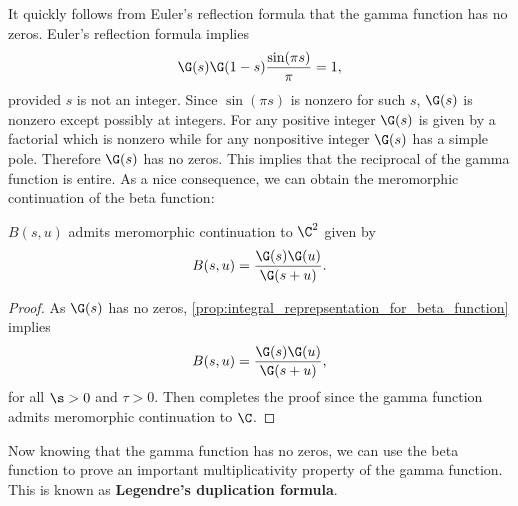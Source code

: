 \documentclass[12pt]{article}
\begin{document}
      It quickly follows from Euler's reflection formula that the gamma function has no zeros. Euler's reflection formula implies
      \[
        \G(s)\G(1-s)\frac{\sin(\pi s)}{\pi} = 1,
      \]
      provided \(s\) is not an integer. Since \(\sin(\pi s)\) is nonzero for such \(s\), \(\G(s)\) is nonzero except possibly at integers. For any positive integer \(\G(s)\) is given by a factorial which is nonzero while for any nonpositive integer \(\G(s)\) has a simple pole. Therefore \(\G(s)\) has no zeros. This implies that the reciprocal of the gamma function is entire. As a nice consequence, we can obtain the meromorphic continuation of the beta function:

      \begin{theorem}\label{thm:continuation_of_beta_function}
        \(B(s,u)\) admits meromorphic continuation to \(\C^{2}\) given by
        \[
          B(s,u) = \frac{\G(s)\G(u)}{\G(s+u)}.
        \]
      \end{theorem}
      \begin{proof}
        As \(\G(s)\) has no zeros, \cref{prop:integral_reprepsentation_for_beta_function} implies
        \[
          B(s,u) = \frac{\G(s)\G(u)}{\G(s+u)},
        \]
        for all \(\s > 0\) and \(\tau > 0\). Then completes the proof since the gamma function admits meromorphic continuation to \(\C\).
      \end{proof}

      Now knowing that the gamma function has no zeros, we can use the beta function to prove an important multiplicativity property of the gamma function. This is known as \textbf{Legendre's duplication formula}.
\end{document}
